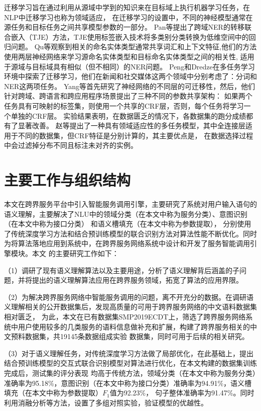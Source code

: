 迁移学习旨在通过利用从源域中学到的知识来在目标域上执行机器学习任务\cite{pan2009survey}，在NLP中迁移学习也称为领域适应，
在迁移学习的设置中，不同的神经模型通常在源任务和目标任务之间共享模型参数的一部分。
Pan等提出了跨域NER的转移联合嵌入（TJE）方法，TJE使用标签嵌入技术将多类别分类转换为低维空间中的回归问题\cite{pan2013transfer}。 
Qu等观察到相关的命名实体类型通常共享词汇和上下文特征\cite{qu2016named},他们的方法使用两层神经网络来学习源命名实体类型和目标命名实体类型之间的相关性,
适用于源域与目标域具有相似（但不相同）的NER问题。 
Peng和Dredze在多任务学习环境中探索了迁移学习\cite{peng2016multi}，他们在新闻和社交媒体这两个领域中分别考虑了：分词和NER这两项任务。
Yang等首先研究了神经网络的不同层的可迁移性\cite{yang2017transfer}，然后，他们针对跨域、跨语言和跨应用程序场景提出了三种不同的参数共享架构：
如果两个任务具有可映射的标签集，则使用一个共享的CRF层，否则，每个任务将学习一个单独的CRF层。
实验结果表明，在数据匮乏的情况下，各数据集的跑分成绩都有了显著改善。 
赵等提出了一种具有领域适应性的多任务模型，其中全连接层适用于不同的数据集，但CRF特征是分别计算的，其主要优点是，
在数据选择过程中会过滤掉分布不同且标注未对齐的实例\cite{zhao2018improve}。



\section{主要工作与组织结构}
本文在跨界服务平台中引入智能服务调用引擎，主要研究了系统对用户输入语句的语义理解，主要解决了NLU中的领域分类（在本文中称为服务分类）、意图识别（在本文中称为接口分类）
和语义槽填充（在本文中称为参数提取），
分别使用了传统深度学习方法和结合预训练模型的联合识别方法对算法性能不断优化。同时为将算法落地应用到系统中，在跨界服务网络系统中设计和开发了服务智能调用引擎模块。本文
的主要研究工作如下：

（1）调研了现有语义理解算法以及主要用途，分析了语义理解背后涵盖的子问题，并将提出的语义理解算法应用在跨界服务领域，拓宽了算法的应用界限。

（2）为解决跨界服务网络中智能服务调用的问题，离不开充分的数据。在调研语义理解相关的公开数据集后，发现高质量的可用于跨界服务网络的中文语料数据集相对匮乏，
为此，本文在已有数据集SMP2019ECDT上，筛选了跨界服务网络系统中用户使用较多的几类服务的语料信息做补充和扩展，构建了跨界服务相关的中文预料数据集，共19145条数据组成实验
数据集，同时可用于后续的相关研究。

（3）对于语义理解任务，对传统深度学习方法做了局部优化，在此基础上，提出结合预训练模型的交互式联合识别模型对算法进行优化，在本文构建的数据集训练完成后，测试集的评分表现
均高于传统方法，领域分类（在本文中称为服务分类）准确率为95.18\%，意图识别（在本文中称为接口分类）准确率为94.91\%，语义槽填充（在本文中称为参数提取）$F_1$值为92.23\%，
句子整体准确率为91.47\%。同时利用消融分析等方法，设置了多组对照实验，验证模型的优越性。

